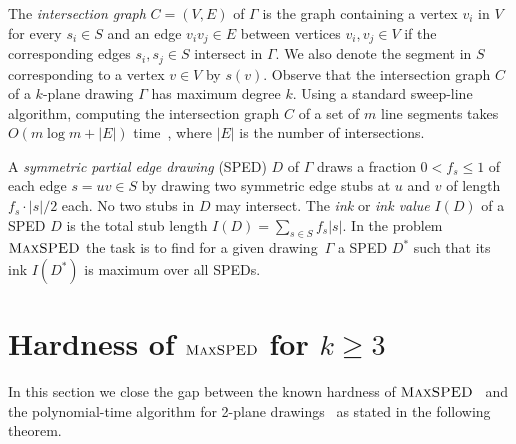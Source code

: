\documentclass[a4paper,english,numberwithinsect]{eurocg18}
\newcommand{\martin}[1]{\todo[inline,color=blue!40]{MN: #1}}
\newcommand{\fabian}[1]{\todo[inline,color=pink!40]{FK: #1}}
\newcommand{\ped}{\ensuremath{\textsc{PED}}\xspace}
\newcommand{\maxsped}{\ensuremath{\textsc{MaxSPED}}\xspace}
\begin{document}
The \emph{intersection graph} $ C = (V,E) $ of $ \Gamma $ is the graph containing a vertex $v_i$ in $ V $ for every $ s_i \in S $ and an edge $ v_i v_j \in E $ between vertices $ v_i, v_j \in V $ if the corresponding edges $ s_i, s_j \in S $ intersect in $ \Gamma $. 
We also denote the segment in $S$ corresponding to a vertex $v \in V$ by $s(v)$.
Observe that the intersection graph $ C $ of a $ k $-plane drawing $ \Gamma $ has maximum degree $ k $.  
%
Using a standard sweep-line algorithm, computing the intersection graph $C$ of a set of $m$ line segments takes $O(m \log m + |E|)$ time~\cite{bcko-cgaa-08}, where $|E|$ is  the number of intersections.

A \emph{symmetric partial edge drawing} (SPED) $D$ of $\Gamma$ draws a fraction $0 < f_s \le 1$ of each edge $s = uv \in S$ by drawing two symmetric edge stubs at $u$ and $v$ of length $f_s \cdot |s|/2$ each. 
No two stubs in $D$ may intersect.
The \emph{ink} or \emph{ink value}  $I(D)$ of a SPED $D$ is the total stub length $I(D) = \sum_{s \in S} f_s |s|$.
In the problem \maxsped the task is to find for a given drawing~$\Gamma$ a SPED $D^*$ such that its ink $I(D^*)$ is maximum over all SPEDs.


%
%

\section{Hardness of \maxsped for $k\ge3$}\label{sec:hardness}

In this section we close the gap between the known hardness of \maxsped~\cite{b-sgh-15} and the polynomial-time algorithm for 2-plane drawings~\cite{bcgkmn-pped-17} as stated in the following theorem.
\end{document}
